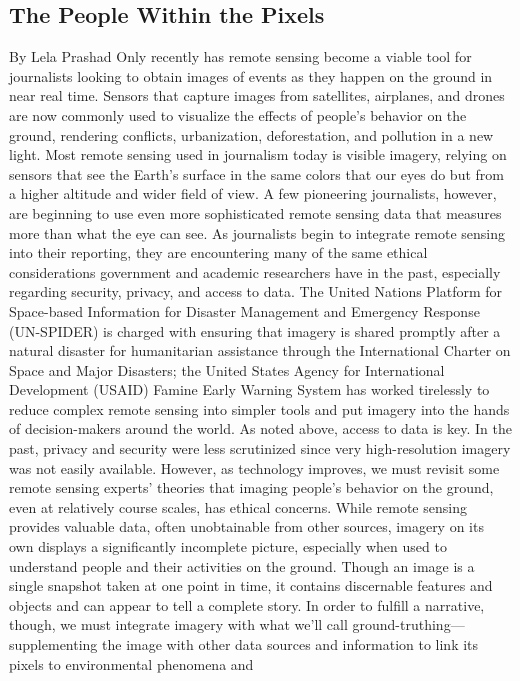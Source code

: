 \begin{itemize}
\section{The People Within the Pixels}
By Lela Prashad
Only recently has remote sensing become a viable tool for journalists looking
to obtain images of events as they happen on the ground in near real
time. Sensors that capture images from satellites, airplanes, and drones
are now commonly used to visualize the effects of people's behavior on the
ground, rendering conflicts, urbanization, deforestation, and pollution in a
new light. Most remote sensing used in journalism today is visible imagery,
relying on sensors that see the Earth's surface in the same colors that our
eyes do but from a higher altitude and wider field of view. A few pioneering
journalists, however, are beginning to use even more sophisticated remote
sensing data that measures more than what the eye can see.
As journalists begin to integrate remote sensing into their reporting, they
are encountering many of the same ethical considerations government
and academic researchers have in the past, especially regarding security,
privacy, and access to data. The United Nations Platform for Space-based
Information for Disaster Management and Emergency Response (UN-SPIDER)
is charged with ensuring that imagery is shared promptly after a natural
disaster for humanitarian assistance through the International Charter
on Space and Major Disasters; the United States Agency for International
Development (USAID) Famine Early Warning System has worked tirelessly
to reduce complex remote sensing into simpler tools and put imagery into
the hands of decision-makers around the world. As noted above, access to
data is key. In the past, privacy and security were less scrutinized since very
high-resolution imagery was not easily available. However, as technology improves, we must revisit some remote sensing experts' theories that imaging
people's behavior on the ground, even at relatively course scales, has
ethical concerns.
While remote sensing provides valuable data, often unobtainable from
other sources, imagery on its own displays a significantly incomplete picture,
especially when used to understand people and their activities on the
ground. Though an image is a single snapshot taken at one point in time, it
contains discernable features and objects and can appear to tell a complete
story. In order to fulfill a narrative, though, we must integrate imagery with
what we'll call ground-truthing—supplementing the image with other data
sources and information to link its pixels to environmental phenomena and

\end{itemize}
